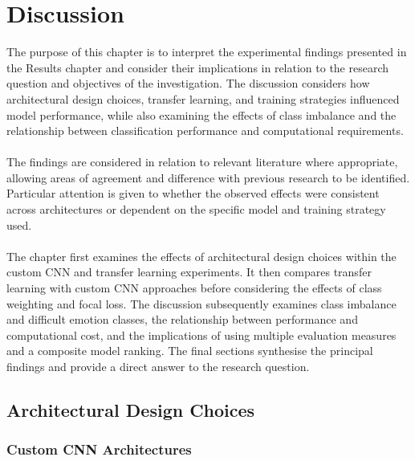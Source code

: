 \documentclass[12pt, a4paper]{report}
\let\oldsection\section
\renewcommand{\section}{%
    \Needspace{6\baselineskip}%
    \oldsection
}
\let\oldsubsection\subsection
\renewcommand{\subsection}{%
    \Needspace{6\baselineskip}%
    \oldsubsection
}
\begin{document}
	\chapter{Discussion}
		
		The purpose of this chapter is to interpret the experimental findings presented in the Results chapter and consider their implications in relation to the research question and objectives of the investigation. The discussion considers how architectural design choices, transfer learning, and training strategies influenced model performance, while also examining the effects of class imbalance and the relationship between classification performance and computational requirements.\\\\
		The findings are considered in relation to relevant literature where appropriate, allowing areas of agreement and difference with previous research to be identified. Particular attention is given to whether the observed effects were consistent across architectures or dependent on the specific model and training strategy used.\\\\
		The chapter first examines the effects of architectural design choices within the custom CNN and transfer learning experiments. It then compares transfer learning with custom CNN approaches before considering the effects of class weighting and focal loss. The discussion subsequently examines class imbalance and difficult emotion classes, the relationship between performance and computational cost, and the implications of using multiple evaluation measures and a composite model ranking. The final sections synthesise the principal findings and provide a direct answer to the research question.
		
		\newpage
		\section{Architectural Design Choices}
			
			\subsection{Custom CNN Architectures}
				
\end{document}
